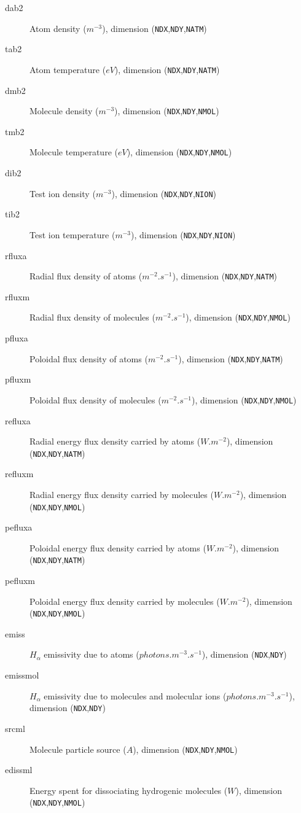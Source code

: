 \documentclass[a4paper,10pt]{report}
\begin{document}
\begin{description}
  \item[dab2] Atom density ($m^{-3}$), dimension ({\tt NDX},{\tt NDY},{\tt NATM})
  \item[tab2] Atom temperature ($eV$), dimension ({\tt NDX},{\tt NDY},{\tt NATM})
  \item[dmb2] Molecule density ($m^{-3}$), dimension ({\tt NDX},{\tt NDY},{\tt NMOL})
  \item[tmb2] Molecule temperature ($eV$), dimension ({\tt NDX},{\tt NDY},{\tt NMOL})
  \item[dib2] Test ion density ($m^{-3}$), dimension ({\tt NDX},{\tt NDY},{\tt NION})
  \item[tib2] Test ion temperature ($m^{-3}$), dimension ({\tt NDX},{\tt NDY},{\tt NION})
  \item[rfluxa] Radial flux density of atoms ($m^{-2}.s^{-1}$), dimension ({\tt NDX},{\tt NDY},{\tt NATM})
  \item[rfluxm] Radial flux density of molecules ($m^{-2}.s^{-1}$), dimension ({\tt NDX},{\tt NDY},{\tt NMOL})
  \item[pfluxa] Poloidal flux density of atoms ($m^{-2}.s^{-1}$), dimension ({\tt NDX},{\tt NDY},{\tt NATM})
  \item[pfluxm] Poloidal flux density of molecules ($m^{-2}.s^{-1}$), dimension ({\tt NDX},{\tt NDY},{\tt NMOL})
  \item[refluxa] Radial energy flux density carried by atoms ($W.m^{-2}$), dimension ({\tt NDX},{\tt NDY},{\tt NATM})
  \item[refluxm] Radial energy flux density carried by molecules ($W.m^{-2}$), dimension ({\tt NDX},{\tt NDY},{\tt NMOL})
  \item[pefluxa] Poloidal energy flux density carried by atoms ($W.m^{-2}$), dimension ({\tt NDX},{\tt NDY},{\tt NATM})
  \item[pefluxm] Poloidal energy flux density carried by molecules ($W.m^{-2}$), dimension ({\tt NDX},{\tt NDY},{\tt NMOL})
  \item[emiss] $H_\alpha$ emissivity due to atoms ($photons.m^{-3}.s^{-1}$), dimension ({\tt NDX},{\tt NDY})
  \item[emissmol] $H_\alpha$ emissivity due to molecules and molecular ions ($photons.m^{-3}.s^{-1}$), dimension ({\tt NDX},{\tt NDY})
  \item[srcml] Molecule particle source ($A$), dimension ({\tt NDX},{\tt NDY},{\tt NMOL})
  \item[edissml] Energy spent for dissociating hydrogenic molecules ($W$), dimension ({\tt NDX},{\tt NDY},{\tt NMOL})

\end{description}
\end{document}
